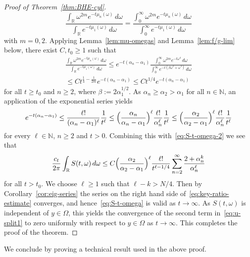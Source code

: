 \documentclass[a4paper, reqno,titlepage]{amsart}
\numberwithin{equation}{section}
\theoremstyle{plain}
\theoremstyle{definition}
\theoremstyle{remark}
\newcommand{\NN}{\mathbb{N}}
\newcommand{\RR}{\mathbb{R}}
\begin{document}
\begin{proof}[Proof of Theorem~\ref{thm:BHE-cyl}]
  \begin{equation*}
    \frac{ \int_\RR \omega^{2m} e^{-t \mu_n(\omega) } \,d\omega}{\int_\RR e^{-t\mu_1(\omega)} \,d\omega }
    = \frac{ \int_0^\infty \omega^{2m}e^{-t \mu_n(\omega) } \,d\omega}{\int_0^\infty e^{-t\mu_1(\omega)} \,d\omega }
  \end{equation*}
  with $m=0,2$. Applying Lemma~\ref{lem:mu-omegas} and Lemma~\ref{lem:f/g-lim} below, there exist $C,t_0\geq 1$ such that
  \begin{multline}
    \label{eq:key-ratio}
    \frac{ \int_\RR \omega^{2m} e^{-t \mu_n(\omega) } \,d\omega}{\int_\RR e^{-t\mu_1(\omega)} \,d\omega }
    \leq e^{-t(\alpha_n-\alpha_1)}\frac{ \int_0^\infty \omega^{2m} e^{-t\omega^4 }\,d\omega}{\int_0^\infty e^{-t(\beta\omega^2+\omega^4)}\,d\omega }\\
    \leq Ct^{\frac{1}{4}-\frac{1}{2m}}e^{-t(\alpha_n-\alpha_1)}
    \leq Ct^{1/4}e^{-t(\alpha_n-\alpha_1)}
  \end{multline}
  for all $t\geq t_0$ and $n\geq 2$, where $\beta:=2\alpha_1^{1/2}$. As $\alpha_n\geq\alpha_2>\alpha_1$ for all $n\in\NN$, an application of the exponential series yields
  \begin{equation*}
    e^{-t(\alpha_n-\alpha_1)}
    \leq\frac{\ell!}{(\alpha_n-\alpha_1)^\ell}\frac{1}{t^\ell}
    \leq\Bigl(\frac{\alpha_n}{\alpha_n-\alpha_1}\Bigr)^{\ell}\frac{\ell!}{\alpha_n^\ell}\frac{1}{t^\ell}
    \leq\Bigl(\frac{\alpha_2}{\alpha_2-\alpha_1}\Bigr)^{\ell}\frac{\ell!}{\alpha_n^\ell}\frac{1}{t^\ell}
  \end{equation*}
  for every $\ell\in\NN$, $n \ge 2$ and $t > 0$. Combining this with~\eqref{eq:S-t-omega-2} we see that
  \begin{equation}
    \label{eq:key-ratio-estimate}
    \frac{c_t}{2\pi} \int_\RR S(t, \omega) \,d\omega
    \leq C\Bigl(\frac{\alpha_2}{\alpha_2-\alpha_1}\Bigr)^{\ell}\frac{\ell!}{t^{\ell-1/4}}\sum_{n=2}^\infty \frac{2+\alpha_n^k}{\alpha_n^\ell}
  \end{equation}
  for all $t>t_0$. We choose $\ell\geq 1$ such that $\ell-k>N/4$. Then by Corollary~\ref{cor:eig-series} the series on the right hand side of~\eqref{eq:key-ratio-estimate} converges, and hence~\eqref{eq:S-t-omega} is valid as $t\to\infty$. As $S(t,\omega)$ is independent of $y\in\Omega$, this yields the convergence of the second term in~\eqref{eq:u-split1} to zero uniformly with respect to $y\in\Omega$ as $t\to\infty$. This completes the proof of the theorem.
\end{proof}
%
We conclude by proving a technical result used in the above proof.
\end{document}
